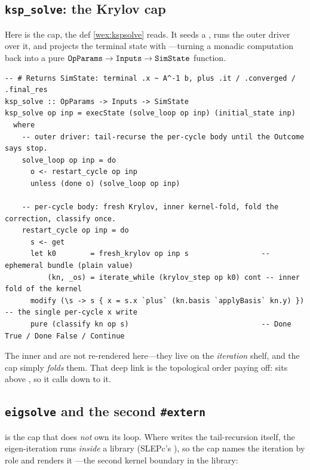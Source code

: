 \subsection{\texttt{ksp\_solve}: the Krylov cap}

Here is the cap, the def \cref{wex:kspsolve} reads. It seeds a ,
runs the outer driver over it, and projects the terminal state with
---turning a monadic computation back into a pure
$\texttt{OpParams}\to\texttt{Inputs}\to\texttt{SimState}$ function.

\begin{lstlisting}[style=l4style]
-- # Returns SimState: terminal .x ~ A^-1 b, plus .it / .converged / .final_res
ksp_solve :: OpParams -> Inputs -> SimState
ksp_solve op inp = execState (solve_loop op inp) (initial_state inp)
  where
    -- outer driver: tail-recurse the per-cycle body until the Outcome says stop.
    solve_loop op inp = do
      o <- restart_cycle op inp
      unless (done o) (solve_loop op inp)

    -- per-cycle body: fresh Krylov, inner kernel-fold, fold the correction, classify once.
    restart_cycle op inp = do
      s <- get
      let k0        = fresh_krylov op inp s                 -- ephemeral bundle (plain value)
          (kn, _os) = iterate_while (krylov_step op k0) cont -- inner fold of the kernel
      modify (\s -> s { x = s.x `plus` (kn.basis `applyBasis` kn.y) })  -- the single per-cycle x write
      pure (classify kn op s)                               -- Done True / Done False / Continue
\end{lstlisting}
The inner  and  are not re-rendered
here---they live on the \emph{iteration} shelf, and the cap simply \emph{folds}
them. That deep link is the topological order paying off:  sits
above , so it calls down to it.

\subsection{\texttt{eigsolve} and the second \texttt{\#extern}}

 is the cap that does \emph{not} own its loop. Where 
writes the tail-recursion itself, the eigen-iteration runs \emph{inside} a library
(SLEPc's ), so the cap names the iteration by role and renders it
---the second kernel boundary in the library:

